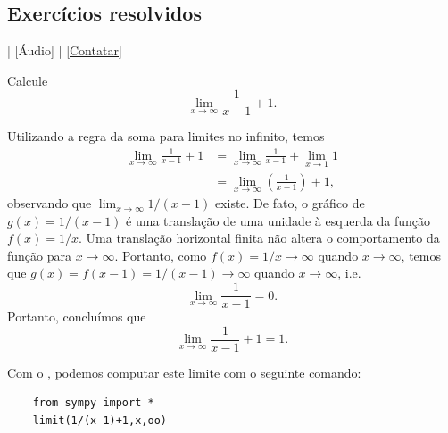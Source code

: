 \subsection*{Exercícios resolvidos}

\begin{flushright}
  [Vídeo] | [Áudio] | \href{https://phkonzen.github.io/notas/contato.html}{[Contatar]}
\end{flushright}

\begin{exeresol}
  Calcule
  \begin{equation}
    \lim_{x\to \infty} \frac{1}{x-1}+1.
  \end{equation}
\end{exeresol}
\begin{resol}
  Utilizando a regra da soma para limites no infinito, temos
  \begin{align}
    \lim_{x\to\infty} \frac{1}{x-1} + 1 &= \lim_{x\to \infty} \frac{1}{x-1} + \lim_{x\to 1} 1\\
                                        &= \lim_{x\to \infty} \left(\frac{1}{x-1}\right)+1,
  \end{align}
  observando que $\lim_{x\to \infty}1/(x-1)$ existe. De fato, o gráfico de $g(x) = 1/(x-1)$ é uma translação de uma unidade à esquerda da função $f(x)=1/x$. Uma translação horizontal finita não altera o comportamento da função para $x\to \infty$. Portanto, como $f(x)=1/x\to\infty$ quando $x\to\infty$, temos que $g(x)=f(x-1)=1/(x-1)\to\infty$ quando $x\to\infty$, i.e.
  \begin{equation}
    \lim_{x\to\infty}\frac{1}{x-1} = 0.
  \end{equation}
  Portanto, concluímos que
  \begin{equation}
    \lim_{x\to \infty} \frac{1}{x-1} + 1 = 1. 
  \end{equation}

  \ifispython
  Com o {\sympy}, podemos computar este limite com o seguinte comando:
  \begin{lstlisting}
    from sympy import *
    limit(1/(x-1)+1,x,oo)
  \end{lstlisting}
  \fi
\end{resol}

